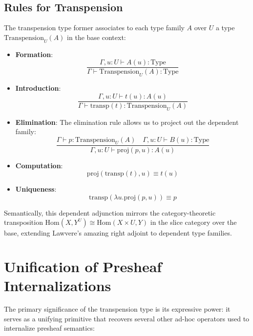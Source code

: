 \documentclass{article}
\begin{document}
\subsection{Rules for Transpension}
The transpension type former associates to each type family $A$ over $U$ a type $\mathrm{Transpension}_U(A)$ in the base context:

\begin{itemize}
  \item \textbf{Formation}:
    \[
    \frac{\Gamma, u : U \vdash A(u) : \text{Type}}{\Gamma \vdash \mathrm{Transpension}_U(A) : \text{Type}}
    \]
  \item \textbf{Introduction}:
    \[
    \frac{\Gamma, u : U \vdash t(u) : A(u)}{\Gamma \vdash \mathrm{transp}(t) : \mathrm{Transpension}_U(A)}
    \]
  \item \textbf{Elimination}: The elimination rule allows us to project out the dependent family:
    \[
    \frac{\Gamma \vdash p : \mathrm{Transpension}_U(A) \quad \Gamma, u : U \vdash B(u) : \text{Type}}{\Gamma, u : U \vdash \mathrm{proj}(p, u) : A(u)}
    \]
  \item \textbf{Computation}:
    \[
    \mathrm{proj}(\mathrm{transp}(t), u) \equiv t(u)
    \]
  \item \textbf{Uniqueness}:
    \[
    \mathrm{transp}(\lambda u. \mathrm{proj}(p, u)) \equiv p
    \]
\end{itemize}

Semantically, this dependent adjunction mirrors the category-theoretic transposition $\mathrm{Hom}(X, Y^U) \cong \mathrm{Hom}(X \times U, Y)$ in the slice category over the base, extending Lawvere's amazing right adjoint to dependent type families.

\section{Unification of Presheaf Internalizations}
The primary significance of the transpension type is its expressive power: it serves as a unifying primitive that recovers several other ad-hoc operators used to internalize presheaf semantics:
\end{document}
